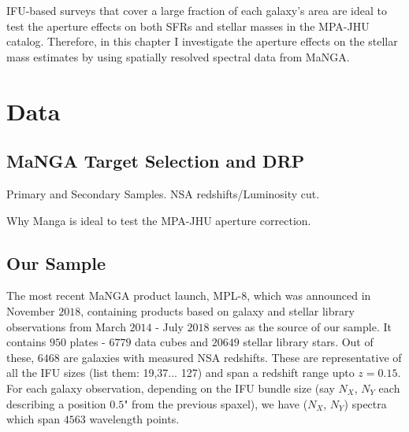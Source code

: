 
IFU-based surveys that cover a large fraction of each
galaxy's area are ideal to test the aperture 
effects on both SFRs and stellar masses in the MPA-JHU 
catalog. Therefore, in this chapter I investigate the aperture 
effects on the stellar mass estimates by using spatially 
resolved spectral data from MaNGA.\\


\section{Data}

\subsection{MaNGA Target Selection and DRP}
\label{mangadrp}
Primary and Secondary Samples. NSA redshifts/Luminosity cut.


Why Manga is ideal to test the MPA-JHU aperture correction.

\subsection{Our Sample}
The most recent MaNGA product launch, MPL-$8$, which was announced in November $2018$, containing products based on galaxy and stellar library observations from March $2014$ - July $2018$ serves as the source of our sample. It contains $950$ plates - $6779$ data cubes and $20649$ stellar library stars. Out of these, $6468$ are galaxies with measured NSA redshifts. These are representative of all the IFU sizes (list them: 19,37... 127) and span a redshift range upto $z = 0.15$.\\
For each galaxy observation, depending on the IFU bundle size (say $N_{X}$, $N_{Y}$ each describing a position $0.5$" from the previous spaxel), we have ($N_{X}$, $N_{Y}$) spectra which span $4563$ wavelength points. 

